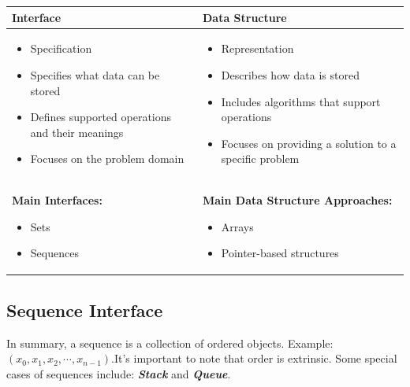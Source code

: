 \documentclass[a4paper,10pt]{article}
\newcommand{\hlt}[1]{\colorbox{color3}{#1}}
\begin{document}
\begin{center}
\renewcommand{\arraystretch}{1}
\small
\begin{tabular}{@{}p{}|p{}@{}}
\toprule
\textbf{Interface} & \textbf{Data Structure} 
\\
\midrule
\begin{itemize}[leftmargin=*, itemsep=0pt]
    \item Specification
    \item Specifies \hlt{what} data can be stored
    \item Defines supported operations and their meanings
    \item Focuses on the problem domain
\end{itemize}
&
\begin{itemize}[leftmargin=*, itemsep=0pt]
    \item Representation
    \item Describes \hlt{how} data is stored
    \item Includes algorithms that support operations
    \item Focuses on providing a solution to a specific problem
\end{itemize}
\\
\midrule
\textbf{Main Interfaces:}
\begin{itemize}[leftmargin=*, itemsep=0pt]
    \item Sets
    \item Sequences
\end{itemize}
&
\textbf{Main Data Structure Approaches:}
\begin{itemize}[leftmargin=*, itemsep=0pt]
    \item Arrays
    \item Pointer-based structures
\end{itemize}
\\
\bottomrule
\end{tabular}
\end{center}

\subsection{Sequence Interface}

In summary, a sequence is a collection of \hlt{ordered} objects. Example: $(x_0, x_1, x_2, \cdots, x_{n-1}). $It's important to note that order is \hlt{extrinsic}. Some special cases of sequences include: \textit{\textbf{Stack}} and \textit{\textbf{Queue}}.
\end{document}
